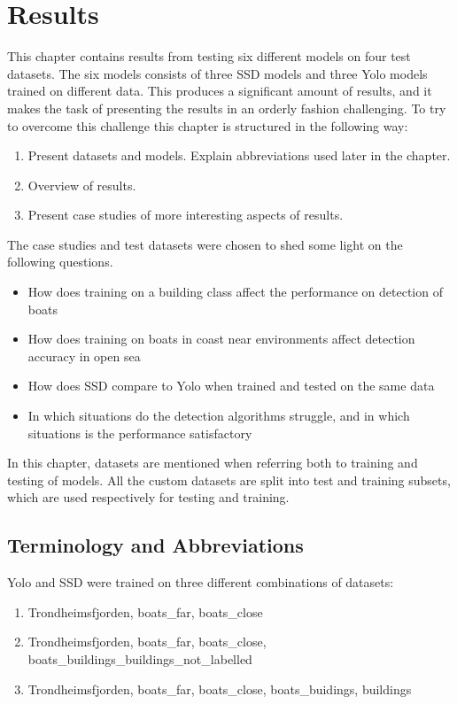 \chapter{Results}
\label{sec:results}

This chapter contains results from testing six different models on four test datasets. The six models consists of three SSD models and three Yolo models trained on different data. This produces a significant amount of results, and it makes the task of presenting the results in an orderly fashion challenging. To try to overcome this challenge this chapter is structured in the following way:

\begin{enumerate}
    \item Present datasets and models. Explain abbreviations used later in the chapter.
    \item Overview of results.
    \item Present case studies of more interesting aspects of results.
\end{enumerate}

\noindent
The case studies  and test datasets were chosen to shed some light on the following questions.

\begin{itemize}
    \item How does training on a building class affect the performance on detection of boats
    \item How does training on boats in coast near environments affect detection accuracy in open sea
    \item How does SSD compare to Yolo when trained and tested on the same data
    \item In which situations do the detection algorithms struggle, and in which situations is the performance satisfactory
\end{itemize}

In this chapter, datasets are mentioned when referring both to training and testing of models. All the custom datasets are split into test and training subsets, which are used respectively for testing and training.

\section{Terminology and Abbreviations}
Yolo and SSD were trained on three different combinations of datasets:


\begin{enumerate}
    \item Trondheimsfjorden, boats\_far, boats\_close
    \item Trondheimsfjorden, boats\_far, boats\_close, boats\_buildings\_buildings\_not\_labelled
    \item Trondheimsfjorden, boats\_far, boats\_close, boats\_buidings, buildings
\end{enumerate}

